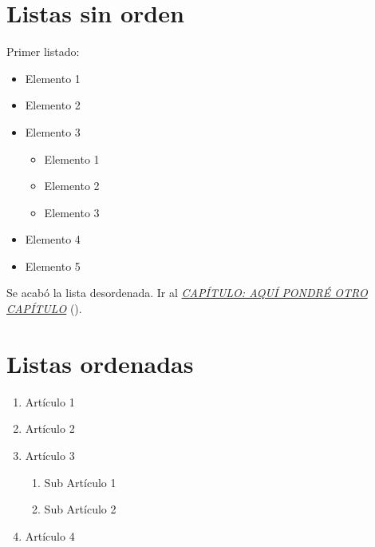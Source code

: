 \documentclass[letterpaper,10pt,english]{sphinxmanual}
\begin{document}
\section{Listas sin orden}
\label{imagenes:listas-sin-orden}
Primer listado:
\begin{itemize}
\item {} 
Elemento 1

\item {} 
Elemento 2

\item {} 
Elemento 3
\begin{itemize}
\item {} 
Elemento 1

\item {} 
Elemento 2

\item {} 
Elemento 3

\end{itemize}

\item {} 
Elemento 4

\item {} 
Elemento 5

\end{itemize}

Se acabó la lista desordenada. Ir al {\hyperref[introduccion:capitulo2]{\emph{CAPÍTULO: AQUÍ PONDRÉ OTRO CAPÍTULO}}} ().


\section{Listas ordenadas}
\label{imagenes:listas-ordenadas}\begin{enumerate}
\item {} 
Artículo 1

\item {} 
Artículo 2

\item {} 
Artículo 3
\begin{enumerate}
\item {} 
Sub Artículo 1

\item {} 
Sub Artículo 2

\end{enumerate}

\item {} 
Artículo 4

\end{enumerate}
\end{document}

